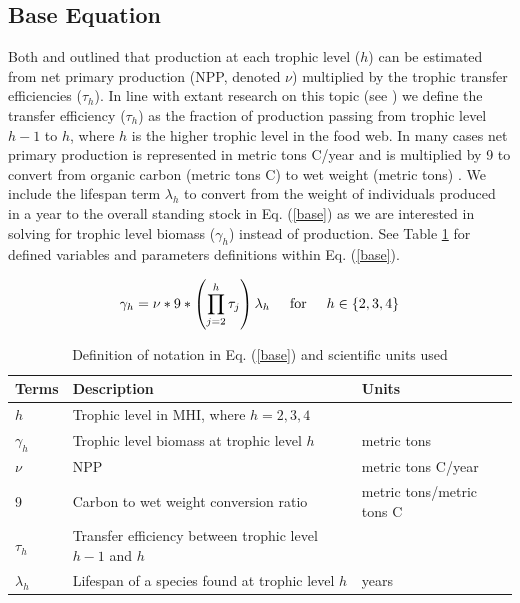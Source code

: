 \documentclass[oneside,12pt,final]{sty/ucthesis-CA2012}
\let\cite\citep                             %
\begin{document}
\begin{mainmatter}
\subsection*{Base Equation}
Both \citet{lalli1997biological} and \citet{libralato2008novel} outlined that production at each trophic level ($h$) can be estimated from net primary production  (NPP, denoted $\nu$) multiplied by the trophic transfer efficiencies ($\tau_h$). In line with extant research on this topic (see \citealt{cury2005trophodynamic, libralato2008novel, chassot2010global, trebilco2013ecosystem, watson2014primary}) we define the transfer efficiency ($\tau_h$) as the fraction of production passing from trophic level $h-1$ to $h$, where $h$ is the higher trophic level in the food web. In many cases net primary production is represented in metric tons C/year and is multiplied by 9 to convert from organic carbon (metric tons C) to wet weight (metric tons) \cite{strathmann1967estimating, pauly1995primary, chassot2010global}. We include the lifespan term $\lambda_h$ to convert from the weight of individuals produced in a year to the overall standing stock in Eq. (\ref{base}) as we are interested in solving for trophic level biomass ($\gamma_h$) instead of production. See Table \ref{description} for defined variables and parameters definitions within Eq. (\ref{base}).

\begin{equation} \label{base}
\gamma_h = \nu * 9 * \left( \prod_{j=2}^{h} \tau_j \right) \lambda_h \hspace{5mm} \text{for} \hspace{5mm} h \in \{2, 3, 4\}
\end{equation}

\begin{table}[H]
\centering
\caption{Definition of notation in Eq. (\ref{base}) and scientific units used}
\begin{tabular}{l|l|l}
  \hline \small
 Terms & Description & Units  \\ 
   \hline
   $h$ & Trophic level in MHI, where $h = 2,3,4$  & \\
   $\gamma_h$ &  Trophic level biomass at trophic level $h$ & metric tons  \\
   $\nu$ & NPP & metric tons C/year \\
   9 & Carbon to wet weight conversion ratio & metric tons/metric tons C \\
   $\tau_{h}$ & Transfer efficiency between trophic level $h-1$ and $h$ &   \\  
   $\lambda_h$ & Lifespan of a species found at trophic level $h$ & years \\
   \hline
\end{tabular} 
\label{description}
\end{table}


\end{mainmatter}
\end{document}
